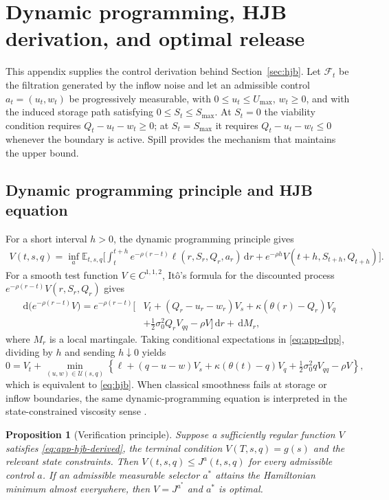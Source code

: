 \documentclass[11pt,a4paper]{article}
\newcommand{\E}{\mathbb{E}}
\newcommand{\dif}{\,\mathrm{d}}
\newtheorem{proposition}{Proposition}
\begin{document}
\section{Dynamic programming, HJB derivation, and optimal release}
\label{app:hjb}
This appendix supplies the control derivation behind
Section~\ref{sec:hjb}. Let $\mathcal F_t$ be the filtration generated by the inflow
noise and let an admissible control $a_t=(u_t,w_t)$ be progressively measurable,
with $0\le u_t\le U_{\max}$, $w_t\ge0$, and with the induced storage path satisfying
$0\le S_t\le S_{\max}$. At $S_t=0$ the viability condition requires
$Q_t-u_t-w_t\ge0$; at $S_t=S_{\max}$ it requires $Q_t-u_t-w_t\le0$ whenever the
boundary is active. Spill provides the mechanism that maintains the upper bound.

\subsection{Dynamic programming principle and HJB equation}
For a short interval $h>0$, the dynamic programming principle gives
\begin{multline}
 V(t,s,q)=\inf_{a}\E_{t,s,q}\Bigg[
 \int_t^{t+h}e^{-\rho(r-t)}\ell(r,S_r,Q_r,a_r)\dif r +e^{-\rho h}V(t+h,S_{t+h},Q_{t+h})\Bigg].
 \label{eq:app-dpp}
\end{multline}
For a smooth test function $V\in C^{1,1,2}$, It\^o's formula for the discounted
process $e^{-\rho(r-t)}V(r,S_r,Q_r)$ gives
\begin{align}
 \dif\big(e^{-\rho(r-t)}V\big)
 =e^{-\rho(r-t)}\Big[&V_t+(Q_r-u_r-w_r)V_s
 +\kappa(\theta(r)-Q_r)V_q \\
 &+\tfrac12\sigma_0^2Q_rV_{qq}-\rho V\Big]\dif r
 +\dif M_r,
 \label{eq:app-discounted-ito}
\end{align}
where $M_r$ is a local martingale. Taking conditional expectations in
\eqref{eq:app-dpp}, dividing by $h$ and sending $h\downarrow0$ yields
\begin{equation}
 0=V_t+\min_{(u,w)\in\mathcal U(s,q)}\left\{
 \ell+(q-u-w)V_s+\kappa(\theta(t)-q)V_q
 +\tfrac12\sigma_0^2qV_{qq}-\rho V\right\},
 \label{eq:app-hjb-derived}
\end{equation}
which is equivalent to \eqref{eq:hjb}. When classical smoothness fails at storage
or inflow boundaries, the same dynamic-programming equation is interpreted in the
state-constrained viscosity sense \cite{fleming2006,crandall1992,soner1986}.

\begin{proposition}[Verification principle]\label{prop:verification}
Suppose a sufficiently regular function $V$ satisfies
\eqref{eq:app-hjb-derived}, the terminal condition $V(T,s,q)=g(s)$ and the relevant
state constraints. Then $V(t,s,q)\le J^a(t,s,q)$ for every admissible control $a$.
If an admissible measurable selector $a^*$ attains the Hamiltonian minimum almost
everywhere, then $V=J^{a^*}$ and $a^*$ is optimal.
\end{proposition}
\end{document}
